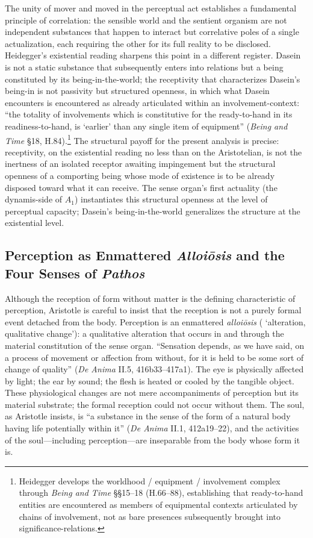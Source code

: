The unity of mover and moved in the perceptual act establishes a fundamental principle of correlation: the sensible world and the sentient organism are not independent substances that happen to interact but correlative poles of a single actualization, each requiring the other for its full reality to be disclosed. Heidegger's existential reading sharpens this point in a different register. Dasein is not a static substance that subsequently enters into relations but a being constituted by its being-in-the-world; the receptivity that characterizes Dasein's being-in is not passivity but structured openness, in which what Dasein encounters is encountered as already articulated within an involvement-context: ``the totality of involvements which is constitutive for the ready-to-hand in its readiness-to-hand, is `earlier' than any single item of equipment'' (\textit{Being and Time} \S 18, H.84).\footnote{Heidegger develops the worldhood / equipment / involvement complex through \textit{Being and Time} \S\S 15--18 (H.66--88), establishing that ready-to-hand entities are encountered as members of equipmental contexts articulated by chains of involvement, not as bare presences subsequently brought into significance-relations.} The structural payoff for the present analysis is precise: receptivity, on the existential reading no less than on the Aristotelian, is not the inertness of an isolated receptor awaiting impingement but the structural openness of a comporting being whose mode of existence is to be already disposed toward what it can receive. The sense organ's first actuality (the dynamis-side of $A_1$) instantiates this structural openness at the level of perceptual capacity; Dasein's being-in-the-world generalizes the structure at the existential level.

\subsection{Perception as Enmattered \textit{Alloiōsis} and the Four Senses of \textit{Pathos}}

Although the reception of form without matter is the defining characteristic of perception, Aristotle is careful to insist that the reception is not a purely formal event detached from the body. Perception is an enmattered \textit{alloiōsis} ( `alteration, qualitative change'): a qualitative alteration that occurs in and through the material constitution of the sense organ. ``Sensation depends, as we have said, on a process of movement or affection from without, for it is held to be some sort of change of quality'' (\textit{De Anima} II.5, 416b33--417a1). The eye is physically affected by light; the ear by sound; the flesh is heated or cooled by the tangible object. These physiological changes are not mere accompaniments of perception but its material substrate; the formal reception could not occur without them. The soul, as Aristotle insists, is ``a substance in the sense of the form of a natural body having life potentially within it'' (\textit{De Anima} II.1, 412a19--22), and the activities of the soul---including perception---are inseparable from the body whose form it is.

